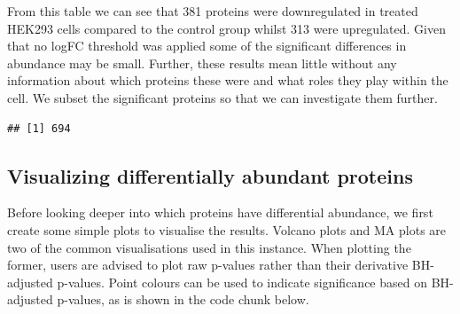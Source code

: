 \documentclass[9pt,a4paper,]{extarticle}
\newenvironment{Shaded}{\begin{snugshade}}{\end{snugshade}}
\newcommand{\DocumentationTok}[1]{\textcolor[rgb]{0.56,0.35,0.01}{\textbf{\textit{#1}}}}
\newcommand{\FloatTok}[1]{\textcolor[rgb]{0.00,0.00,0.81}{#1}}
\newcommand{\FunctionTok}[1]{\textcolor[rgb]{0.13,0.29,0.53}{\textbf{#1}}}
\newcommand{\NormalTok}[1]{#1}
\newcommand{\OtherTok}[1]{\textcolor[rgb]{0.56,0.35,0.01}{#1}}
\newcommand{\SpecialCharTok}[1]{\textcolor[rgb]{0.81,0.36,0.00}{\textbf{#1}}}
\begin{document}
From this table we can see that 381 proteins were downregulated
in treated HEK293 cells compared to the control group whilst 313
were upregulated. Given that no logFC threshold was applied some of the significant
differences in abundance may be small. Further, these results mean little without
any information about which proteins these were and what roles they play within
the cell. We subset the significant proteins so that we can investigate them
further.

\begin{Shaded}
\end{Shaded}

\begin{verbatim}
## [1] 694
\end{verbatim}

\subsection{Visualizing differentially abundant proteins}\label{visualizing-differentially-abundant-proteins}

Before looking deeper into which proteins have differential abundance, we first
create some simple plots to visualise the results. Volcano plots and MA plots
are two of the common visualisations used in this instance. When plotting the
former, users are advised to plot raw p-values rather than their derivative
BH-adjusted p-values. Point colours can be used to indicate significance based
on BH- adjusted p-values, as is shown in the code chunk below.
\end{document}
